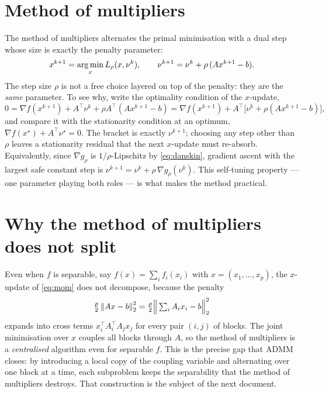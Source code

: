 \documentclass[11pt]{article}
\begin{document}
\section{Method of multipliers}
\label{sec:multipliers}

The method of multipliers alternates the primal minimisation with a dual step whose size is
exactly the penalty parameter:
\begin{equation}
x^{k+1} = \operatorname*{arg\,min}_x L_\rho(x, \nu^k),
\qquad
\nu^{k+1} = \nu^k + \rho\,(A x^{k+1} - b).
\label{eq:mom}
\end{equation}
The step size $\rho$ is not a free choice layered on top of the penalty: they are the
\emph{same} parameter. To see why, write the optimality condition of the $x$-update,
\begin{equation}
0 = \nabla f(x^{k+1}) + A^\top \nu^k + \rho A^\top (A x^{k+1} - b)
  = \nabla f(x^{k+1}) + A^\top\!\big[\nu^k + \rho (A x^{k+1} - b)\big],
\end{equation}
and compare it with the stationarity condition at an optimum,
$\nabla f(x^\star) + A^\top \nu^\star = 0$. The bracket is exactly $\nu^{k+1}$; choosing
any step other than $\rho$ leaves a stationarity residual that the next $x$-update must
re-absorb. Equivalently, since $\nabla g_\rho$ is $1/\rho$-Lipschitz by \eqref{eq:danskin},
gradient ascent with the largest safe constant step is
$\nu^{k+1} = \nu^k + \rho\,\nabla g_\rho(\nu^k)$. This self-tuning property --- one
parameter playing both roles --- is what makes the method practical.

\section{Why the method of multipliers does not split}

Even when $f$ is separable, say $f(x) = \sum_i f_i(x_i)$ with $x = (x_1,\dots,x_p)$, the
$x$-update of \eqref{eq:mom} does not decompose, because the penalty
\begin{equation}
\tfrac{\rho}{2}\left\lVert Ax-b \right\rVert_2^2
= \tfrac{\rho}{2}\Big\lVert \textstyle\sum_i A_i x_i - b \Big\rVert_2^2
\end{equation}
expands into cross terms $x_i^\top A_i^\top A_j x_j$ for every pair $(i,j)$ of blocks. The
joint minimisation over $x$ couples all blocks through $A$, so the method of multipliers is
a \emph{centralised} algorithm even for separable $f$. This is the precise gap that ADMM
closes: by introducing a local copy of the coupling variable and alternating over one block
at a time, each subproblem keeps the separability that the method of multipliers destroys.
That construction is the subject of the next document.
\end{document}
